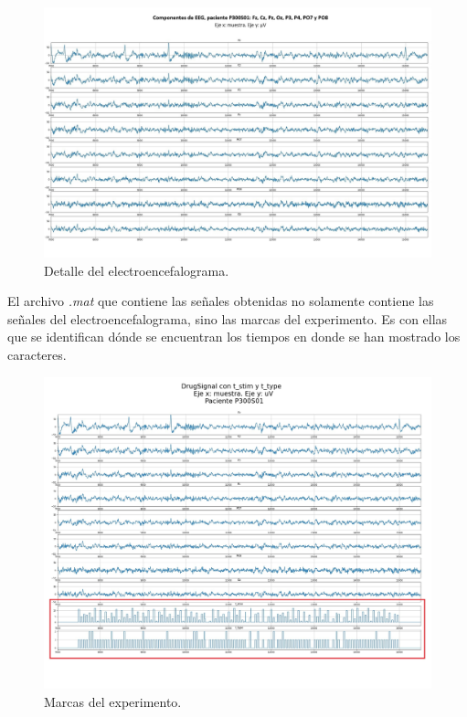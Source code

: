\documentclass[../00_Main.tex]{subfiles}
\begin{document}
\begin{figure}[H]
    \raggedright
    \includegraphics[scale=0.45]{02_Images/EEG}
    \caption{Detalle del electroencefalograma.}
    \label{fig:EEG}
\end{figure}

El archivo \textit{.mat} que contiene las señales obtenidas no solamente contiene las señales del electroencefalograma, sino las marcas del experimento. Es con ellas que se identifican dónde se encuentran los tiempos en donde se han mostrado los caracteres. 

\begin{figure}[H]
    \raggedright
    \includegraphics[scale=0.26]{02_Images/t_stim-t_type}
    \caption{Marcas del experimento.}
    \label{fig:t_stim-t_type}
\end{figure}


\biblio %
\end{document}
